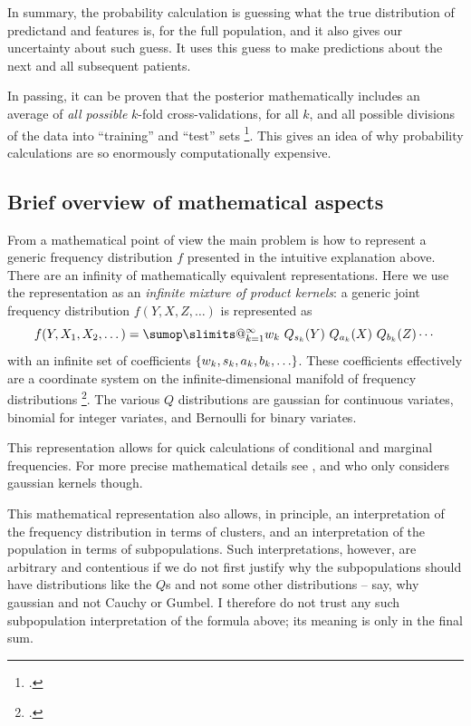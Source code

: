 \documentclass[\ifafour a4paper,12pt,\else a5paper,10pt,\fi%
onecolumn,oneside,article,%
british%
]{memoir}
\makeatletter
\theoremstyle{remark}
\theoremstyle{innote}
\def\sum{\DOTSI\sumop\slimits@}
\newcommand*{\citep}{\footcites}
\DeclarePairedDelimiter\set{\{}{\}} %
\renewcommand*{\|}[1][]{\nonscript\:#1\vert\nonscript\:\mathopen{}}
\makeatother
\begin{document}
In summary, the probability calculation is guessing what the true
distribution of predictand and features is, for the full population, and it
also gives our uncertainty about such guess. It uses this guess to make
predictions about the next and all subsequent patients.

In passing, it can be proven that the posterior mathematically includes an
average of \emph{all possible} $k$-fold cross-validations, for all $k$, and
all possible divisions of the data into \enquote{training} and
\enquote{test} sets \citep{portamana2019b}. This gives an idea of why
probability calculations are so enormously computationally expensive.

\subsection{Brief overview of mathematical aspects}
\label{sec:maths}

From a mathematical point of view the main problem is how to represent a
generic frequency distribution $f$ presented in the intuitive explanation
above. There are an infinity of mathematically equivalent representations.
Here we use the representation as an \emph{infinite mixture of product
  kernels}: a generic joint frequency distribution $f(Y, X, Z, \dotsc)$ is
represented as
\begin{equation}
  \label{eq:freq_repr}
  f(Y, X_{1}, X_{2}, \dotsc) =
  \sum_{k=1}^{\infty} w_{k}\ Q_{s_{k}}(Y)\ Q_{a_{k}}(X)\ Q_{b_{k}}(Z) \dotsm
\end{equation}
with an infinite set of coefficients
$\set{w_{k},s_{k},a_{k},b_{k},\dotsc}$. These coefficients effectively are
a coordinate system on the infinite-dimensional manifold of frequency
distributions \citep[esp.\ Part~VII]{choquetbruhatetal1977_r1996}. The
various $Q$ distributions are gaussian for continuous variates, binomial
for integer variates, and Bernoulli for binary variates.

This representation allows for quick calculations of conditional and
marginal frequencies. For more precise mathematical details see
\textcite{dunsonetal2011}, and \textcite{rasmussen1999} who only considers
gaussian kernels though.

This mathematical representation also allows, in principle, an
interpretation of the frequency distribution in terms of clusters, and an
interpretation of the population in terms of subpopulations. Such
interpretations, however, are arbitrary and contentious if we do not first
justify why the subpopulations should have distributions like the $Q$s and
not some other distributions -- say, why gaussian and not Cauchy or Gumbel.
I therefore do not trust any such subpopulation interpretation of the
formula above; its meaning is only in the final sum.
\end{document}
